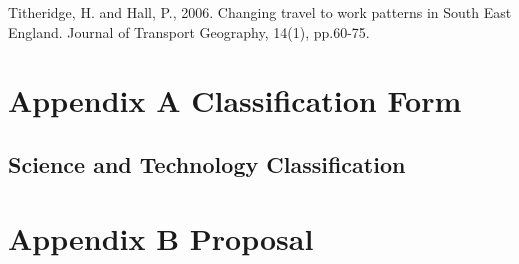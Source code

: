 \documentclass[
  12pt,
  oneside]{book}
\begin{document}
Titheridge, H. and Hall, P., 2006. Changing travel to work patterns in South East England. Journal of Transport Geography, 14(1), pp.60-75.

\printbibliography

\hypertarget{appendix-a-classification-form}{%
\chapter*{Appendix A Classification Form}\label{appendix-a-classification-form}}


\hypertarget{science-and-technology-classification}{%
\section*{Science and Technology Classification}\label{science-and-technology-classification}}

\hypertarget{appendix-b-proposal}{%
\chapter*{Appendix B Proposal}\label{appendix-b-proposal}}

\enddocument

\printbibliography
\end{document}
